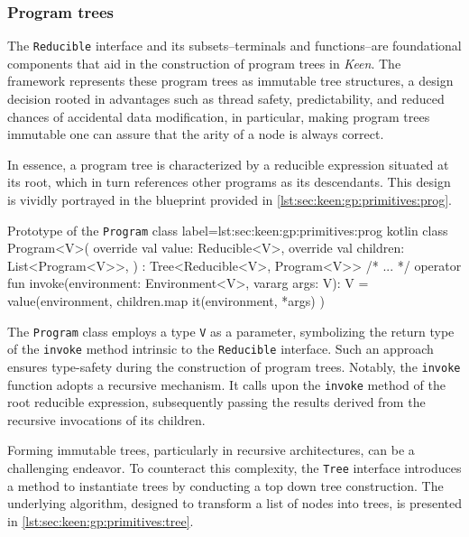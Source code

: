 
\subsubsection{Program trees}
  The \texttt{Reducible} interface and its subsets--terminals and 
  functions--are foundational components that aid in the construction of 
  program trees in \textit{Keen}. The framework represents these program 
  trees as immutable tree structures, a design decision rooted in advantages 
  such as thread safety, predictability, and reduced chances of accidental 
  data modification, in particular, making program trees immutable one can 
  assure that the arity of a node is always correct.

  In essence, a program tree is characterized by a reducible expression 
  situated at its root, which in turn references other programs as its 
  descendants. This design is vividly portrayed in the blueprint provided in 
  \vref{lst:sec:keen:gp:primitives:prog}.

  \begin{code}{Prototype of the \texttt{Program} class}{
    label=lst:sec:keen:gp:primitives:prog
  }{kotlin}
    class Program<V>(
        override val value: Reducible<V>,
        override val children: List<Program<V>>,
    ) : Tree<Reducible<V>, Program<V>> {
        /* ... */
        operator fun invoke(environment: Environment<V>, vararg args: V): V =
            value(environment, children.map { it(environment, *args) })
    }
  \end{code}

  The \texttt{Program} class employs a type \texttt{V} as a parameter, 
  symbolizing the return type of the \texttt{invoke} method intrinsic to the 
  \texttt{Reducible} interface. Such an approach ensures type-safety during the 
  construction of program trees. Notably, the \texttt{invoke} function adopts a 
  recursive mechanism. It calls upon the \texttt{invoke} method of the root 
  reducible expression, subsequently passing the results derived from the 
  recursive invocations of its children.

  Forming immutable trees, particularly in recursive architectures, can be a 
  challenging endeavor. To counteract this complexity, the \texttt{Tree} 
  interface introduces a method to instantiate trees by conducting a top down
  tree construction. The underlying algorithm, designed to transform a list of 
  nodes into trees, is presented in \vref{lst:sec:keen:gp:primitives:tree}.

